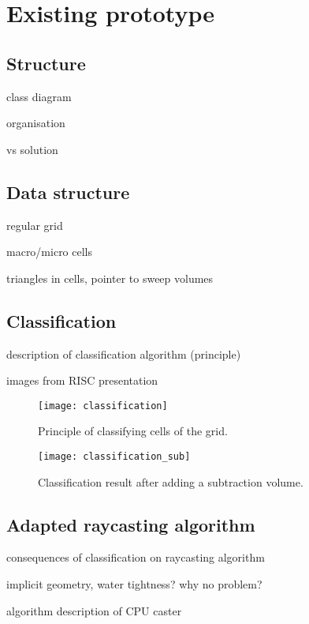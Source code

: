 \section{Existing prototype}
\label{sec:existing_prototype}


\subsection{Structure}
class diagram

organisation

vs solution


\subsection{Data structure}
\label{sec:data_structure}

regular grid

macro/micro cells

triangles in cells, pointer to sweep volumes


\subsection{Classification}

description of classification algorithm (principle)

images from RISC presentation

\begin{figure}
\centering
\texttt{[image: classification]}
\caption{Principle of classifying cells of the grid.}
\label{fig:classification}
\end{figure}

\begin{figure}
\centering
\texttt{[image: classification\_sub]}
\caption{Classification result after adding a subtraction volume. }
\label{fig:classification_sub}
\end{figure}

\subsection{Adapted raycasting algorithm}

consequences of classification on raycasting algorithm

implicit geometry, water tightness? why no problem?

algorithm description of CPU caster
